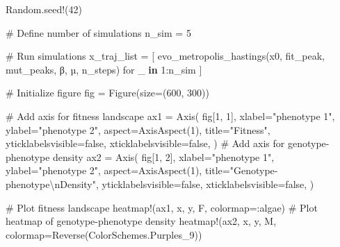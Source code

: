 \documentclass[
]{scrartcl}
\newenvironment{Shaded}{\begin{snugshade}}{\end{snugshade}}
\newcommand{\BuiltInTok}[1]{\textcolor[rgb]{0.00,0.23,0.31}{#1}}
\newcommand{\CommentTok}[1]{\textcolor[rgb]{0.37,0.37,0.37}{#1}}
\newcommand{\ConstantTok}[1]{\textcolor[rgb]{0.56,0.35,0.01}{#1}}
\newcommand{\FloatTok}[1]{\textcolor[rgb]{0.68,0.00,0.00}{#1}}
\newcommand{\FunctionTok}[1]{\textcolor[rgb]{0.28,0.35,0.67}{#1}}
\newcommand{\KeywordTok}[1]{\textcolor[rgb]{0.00,0.23,0.31}{\textbf{#1}}}
\newcommand{\NormalTok}[1]{\textcolor[rgb]{0.00,0.23,0.31}{#1}}
\newcommand{\OperatorTok}[1]{\textcolor[rgb]{0.37,0.37,0.37}{#1}}
\newcommand{\SpecialCharTok}[1]{\textcolor[rgb]{0.37,0.37,0.37}{#1}}
\newcommand{\StringTok}[1]{\textcolor[rgb]{0.13,0.47,0.30}{#1}}
\begin{document}
\begin{Shaded}
\begin{Highlighting}[]
\BuiltInTok{Random}\NormalTok{.}\FunctionTok{seed!}\NormalTok{(}\FloatTok{42}\NormalTok{)}

\CommentTok{\# Define number of simulations}
\NormalTok{n\_sim }\OperatorTok{=} \FloatTok{5}

\CommentTok{\# Run simulations}
\NormalTok{x\_traj\_list }\OperatorTok{=}\NormalTok{ [}
    \FunctionTok{evo\_metropolis\_hastings}\NormalTok{(x0, fit\_peak, mut\_peaks, β, µ, n\_steps)}
\NormalTok{    for \_ }\KeywordTok{in} \FloatTok{1}\OperatorTok{:}\NormalTok{n\_sim}
\NormalTok{]}

\CommentTok{\# Initialize figure}
\NormalTok{fig }\OperatorTok{=} \FunctionTok{Figure}\NormalTok{(size}\OperatorTok{=}\NormalTok{(}\FloatTok{600}\NormalTok{, }\FloatTok{300}\NormalTok{))}

\CommentTok{\# Add axis for fitness landscape}
\NormalTok{ax1 }\OperatorTok{=} \FunctionTok{Axis}\NormalTok{(}
\NormalTok{    fig[}\FloatTok{1}\NormalTok{, }\FloatTok{1}\NormalTok{],}
\NormalTok{    xlabel}\OperatorTok{=}\StringTok{"phenotype 1"}\NormalTok{,}
\NormalTok{    ylabel}\OperatorTok{=}\StringTok{"phenotype 2"}\NormalTok{,}
\NormalTok{    aspect}\OperatorTok{=}\FunctionTok{AxisAspect}\NormalTok{(}\FloatTok{1}\NormalTok{),}
\NormalTok{    title}\OperatorTok{=}\StringTok{"Fitness"}\NormalTok{,}
\NormalTok{    yticklabelsvisible}\OperatorTok{=}\ConstantTok{false}\NormalTok{,}
\NormalTok{    xticklabelsvisible}\OperatorTok{=}\ConstantTok{false}\NormalTok{,}
\NormalTok{)}
\CommentTok{\# Add axis for genotype{-}phenotype density}
\NormalTok{ax2 }\OperatorTok{=} \FunctionTok{Axis}\NormalTok{(}
\NormalTok{    fig[}\FloatTok{1}\NormalTok{, }\FloatTok{2}\NormalTok{],}
\NormalTok{    xlabel}\OperatorTok{=}\StringTok{"phenotype 1"}\NormalTok{,}
\NormalTok{    ylabel}\OperatorTok{=}\StringTok{"phenotype 2"}\NormalTok{,}
\NormalTok{    aspect}\OperatorTok{=}\FunctionTok{AxisAspect}\NormalTok{(}\FloatTok{1}\NormalTok{),}
\NormalTok{    title}\OperatorTok{=}\StringTok{"Genotype{-}phenotype}\SpecialCharTok{\textbackslash{}n}\StringTok{Density"}\NormalTok{,}
\NormalTok{    yticklabelsvisible}\OperatorTok{=}\ConstantTok{false}\NormalTok{,}
\NormalTok{    xticklabelsvisible}\OperatorTok{=}\ConstantTok{false}\NormalTok{,}
\NormalTok{)}

\CommentTok{\# Plot fitness landscape}
\FunctionTok{heatmap!}\NormalTok{(ax1, x, y, F, colormap}\OperatorTok{=:}\NormalTok{algae)}
\CommentTok{\# Plot heatmap of genotype{-}phenotype density}
\FunctionTok{heatmap!}\NormalTok{(ax2, x, y, M, colormap}\OperatorTok{=}\FunctionTok{Reverse}\NormalTok{(ColorSchemes.Purples\_9))}


\end{Highlighting}
\end{Shaded}
\end{document}
